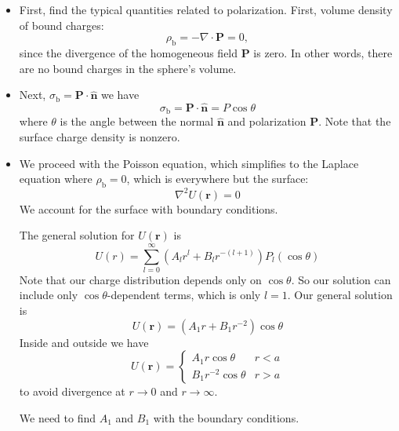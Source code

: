 \documentclass[11pt, a4paper]{article}
\renewcommand{\vec}[1]{\bm{#1}} %
\newcommand{\uvec}[1]{\hat{\vec{#1}}} %
\renewcommand{\r}{\vec{r}}
\renewcommand{\P}{\vec{P}}  %
\renewcommand{\div}{\nabla \cdot}
\renewcommand{\laplacian}{\nabla^{2}}
\begin{document}
\begin{itemize}
	\item First, find the typical quantities related to polarization. First, volume density of bound charges:
	\begin{equation*}
		\rho_{\text{b}} = - \div \P = 0,
	\end{equation*}
	since the divergence of the homogeneous field $ \P $ is zero. In other words, there are no bound charges in the sphere's volume. 
	
	\item Next, $ \sigma_{\text{b}} = \P \cdot \uvec{n} $ we have
	\begin{equation*}
		\sigma_{\text{b}} = \P \cdot \uvec{n} = P \cos \theta
	\end{equation*}
	where $ \theta $ is the angle between the normal $ \uvec{n} $ and polarization $ \P $. Note that the surface charge density is nonzero.
	
	\item We proceed with the Poisson equation, which simplifies to the Laplace equation where $ \rho_{\text{b}} = 0 $, which is everywhere but the surface:
	\begin{equation*}
		\laplacian U(\r) = 0
	\end{equation*}
	We account for the surface with boundary conditions. 
	
	The general solution for $ U(\r) $ is 
	\begin{equation*}
		U(r) = \sum_{l = 0}^{\infty}(A_{l}r^{l} + B_{l}r^{-(l+1)})P_{l}(\cos \theta)
	\end{equation*}
	Note that our charge distribution depends only on $ \cos \theta $. So our solution can include only $ \cos \theta $-dependent terms, which is only $ l = 1 $. Our general solution is
	\begin{equation*}
		U(\r) = (A_{1}r + B_{1}r^{-2})\cos \theta
	\end{equation*}
	Inside and outside we have
	\begin{equation*}
		U(\r) = 
		\begin{cases}
			A_{1}r \cos \theta & r < a\\
			B_{1}r^{-2} \cos \theta & r > a
		\end{cases}
	\end{equation*}
	to avoid divergence at $ r \to 0 $ and $ r \to \infty $. 
	
	We need to find $ A_{1} $ and $ B_{1} $ with the boundary conditions. 
	

\end{itemize}
\end{document}
